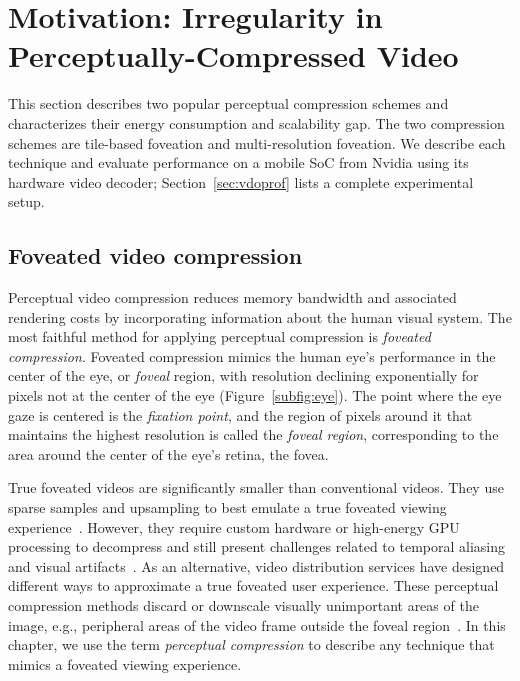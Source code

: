 \section{Motivation: Irregularity in Perceptually-Compressed Video}
\label{sec:characterization}

This section describes two popular perceptual compression schemes and characterizes their energy consumption and scalability gap.
The two compression schemes are tile-based foveation and multi-resolution foveation.
We describe each technique and evaluate performance on a mobile SoC from Nvidia using its hardware video decoder; Section~\ref{sec:vdoprof} lists a complete experimental setup.

\perceptualCompressionExampleFigure


\subsection{Foveated video compression}

Perceptual video compression reduces memory bandwidth and associated rendering costs by incorporating information about the human visual system.
The most faithful method for applying perceptual compression is \emph{foveated compression}.
Foveated compression mimics the human eye's performance in the center of the eye, or \emph{foveal} region, with resolution declining exponentially for pixels not at the center of the eye (Figure~\ref{subfig:eye}).
The point where the eye gaze is centered is the \emph{fixation point}, and the region of pixels around it that maintains the highest resolution is called the \emph{foveal region}, corresponding to the area around the center of the eye's retina, the fovea.


True foveated videos are significantly smaller than conventional videos.
They use sparse samples and upsampling to best emulate a true foveated viewing experience~\cite{patney2017perceptual}.
However, they require custom hardware or high-energy GPU processing to decompress and still present challenges related to temporal aliasing and visual artifacts~\cite{kaplanyan2019deepfovea}.
As an alternative, video distribution services have designed different ways to approximate a true foveated user experience.
These perceptual compression methods discard or downscale visually unimportant areas of the image, e.g., peripheral areas of the video frame outside the foveal region~\cite{google-foveation,fov-cloud-ryoo, visualcloud2017haynes}.
In this chapter, we use the term \emph{perceptual compression} to describe any technique that mimics a foveated viewing experience.


